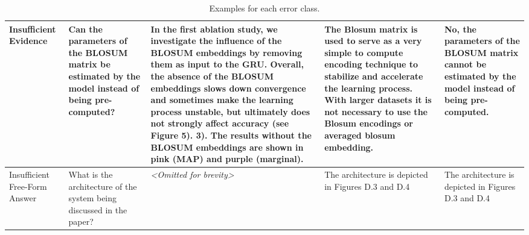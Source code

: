 \begin{table*}[!h]
\begin{adjustbox}{angle=270, width=\textwidth}
\begin{tabularx}{.88\textheight}{@{}p{1.5cm}p{3.5cm}Xp{3.5cm}p{3.5cm}@{}}
Insufficient Evidence & Can the parameters of the BLOSUM matrix be estimated by the model instead of being pre-computed? & In the first ablation study, we investigate the influence of the BLOSUM embeddings by removing them as input to the GRU. Overall, the absence of the BLOSUM embeddings slows down convergence and sometimes make the learning process unstable, but ultimately does not strongly affect accuracy (see Figure 5). 3). The results without the BLOSUM embeddings are shown in pink (MAP) and purple (marginal). & The Blosum matrix is used to serve as a very simple to compute encoding technique to stabilize and accelerate the learning process. With larger datasets it is not necessary to use the Blosum encodings or averaged blosum embedding. & No, the parameters of the BLOSUM matrix cannot be estimated by the model instead of being pre-computed. \\
\midrule

Insufficient Free-Form Answer & What is the architecture of the system being discussed in the paper? & 

\textit{<Omitted for brevity>}
& 
The architecture is depicted in Figures D.3 and D.4 & The architecture is depicted in Figures D.3 and D.4 
\\ 
\bottomrule
\end{tabularx}
\end{adjustbox}
\caption{Examples for each error class.}\label{tbl:error-examples}
\end{table*}